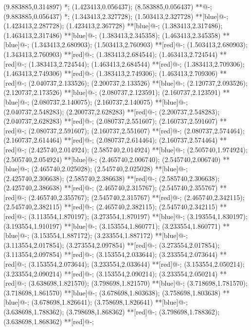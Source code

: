 (9.883885,0.314897) *{};
(1.423413,0.056437); (8.583885,0.056437) **@{-};
(9.883885,0.056437) *{};
(1.343413,2.327728); (1.503413,2.327728) **[blue]@{-};
(1.423413,2.287728); (1.423413,2.367728) **[blue]@{-};
(1.383413,2.317486); (1.463413,2.317486) **[blue]@{-};
(1.383413,2.345358); (1.463413,2.345358) **[blue]@{-};
(1.343413,2.680903); (1.503413,2.760903) **[red]@{-};
(1.503413,2.680903); (1.343413,2.760903) **[red]@{-};
(1.383413,2.684544); (1.463413,2.724544) **[red]@{-};
(1.383413,2.724544); (1.463413,2.684544) **[red]@{-};
(1.383413,2.709306); (1.463413,2.749306) **[red]@{-};
(1.383413,2.749306); (1.463413,2.709306) **[red]@{-};
(2.040737,2.133526); (2.200737,2.133526) **[blue]@{-};
(2.120737,2.093526); (2.120737,2.173526) **[blue]@{-};
(2.080737,2.123591); (2.160737,2.123591) **[blue]@{-};
(2.080737,2.140075); (2.160737,2.140075) **[blue]@{-};
(2.040737,2.548283); (2.200737,2.628283) **[red]@{-};
(2.200737,2.548283); (2.040737,2.628283) **[red]@{-};
(2.080737,2.551607); (2.160737,2.591607) **[red]@{-};
(2.080737,2.591607); (2.160737,2.551607) **[red]@{-};
(2.080737,2.574464); (2.160737,2.614464) **[red]@{-};
(2.080737,2.614464); (2.160737,2.574464) **[red]@{-};
(2.425740,2.014924); (2.585740,2.014924) **[blue]@{-};
(2.505740,1.974924); (2.505740,2.054924) **[blue]@{-};
(2.465740,2.006740); (2.545740,2.006740) **[blue]@{-};
(2.465740,2.025028); (2.545740,2.025028) **[blue]@{-};
(2.425740,2.306638); (2.585740,2.386638) **[red]@{-};
(2.585740,2.306638); (2.425740,2.386638) **[red]@{-};
(2.465740,2.315767); (2.545740,2.355767) **[red]@{-};
(2.465740,2.355767); (2.545740,2.315767) **[red]@{-};
(2.465740,2.342115); (2.545740,2.382115) **[red]@{-};
(2.465740,2.382115); (2.545740,2.342115) **[red]@{-};
(3.113554,1.870197); (3.273554,1.870197) **[blue]@{-};
(3.193554,1.830197); (3.193554,1.910197) **[blue]@{-};
(3.153554,1.860771); (3.233554,1.860771) **[blue]@{-};
(3.153554,1.887172); (3.233554,1.887172) **[blue]@{-};
(3.113554,2.017854); (3.273554,2.097854) **[red]@{-};
(3.273554,2.017854); (3.113554,2.097854) **[red]@{-};
(3.153554,2.033644); (3.233554,2.073644) **[red]@{-};
(3.153554,2.073644); (3.233554,2.033644) **[red]@{-};
(3.153554,2.050214); (3.233554,2.090214) **[red]@{-};
(3.153554,2.090214); (3.233554,2.050214) **[red]@{-};
(3.638698,1.821570); (3.798698,1.821570) **[blue]@{-};
(3.718698,1.781570); (3.718698,1.861570) **[blue]@{-};
(3.678698,1.803638); (3.758698,1.803638) **[blue]@{-};
(3.678698,1.826641); (3.758698,1.826641) **[blue]@{-};
(3.638698,1.788362); (3.798698,1.868362) **[red]@{-};
(3.798698,1.788362); (3.638698,1.868362) **[red]@{-};
